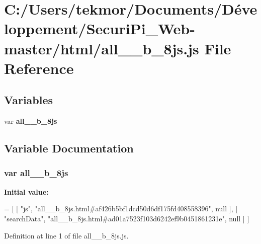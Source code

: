 \section{C\+:/\+Users/tekmor/\+Documents/\+Développement/\+Securi\+Pi\+\_\+\+Web-\/master/html/all\+\_\+\+\_\+b\+\_\+8js.js File Reference}
\label{all____b__8js_8js}
\subsection*{Variables}
\begin{DoxyCompactItemize}
\item 
var {\bf all\+\_\+\+\_\+b\+\_\+8js}
\end{DoxyCompactItemize}


\subsection{Variable Documentation}
\subsubsection[{all\+\_\+\+\_\+b\+\_\+8js}]{\setlength{\rightskip}{0pt plus 5cm}var all\+\_\+\+\_\+b\+\_\+8js}\label{all____b__8js_8js_a1d5118e2e624cd14d369468000a06a4f}
{\bfseries Initial value\+:}
\begin{DoxyCode}
=
[
    [ \textcolor{stringliteral}{"js"}, \textcolor{stringliteral}{"all\_\_b\_8js.html#af426b5bf1dcd50d6df175fd408558396"}, null ],
    [ \textcolor{stringliteral}{"searchData"}, \textcolor{stringliteral}{"all\_\_b\_8js.html#ad01a7523f103d6242ef9b0451861231e"}, null ]
]
\end{DoxyCode}


Definition at line 1 of file all\+\_\+\+\_\+b\+\_\+8js.\+js.

